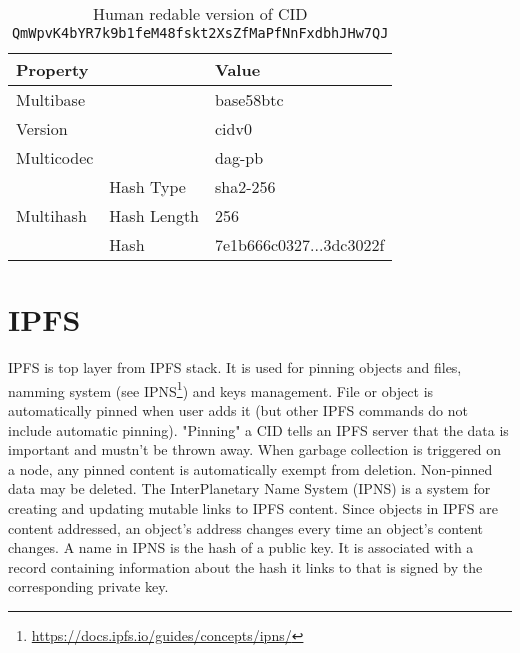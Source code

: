 \begin{table}[]
    \centering
    \begin{tabular}{|ll|l|}
    \hline
    \textbf{Property}                  &             & \textbf{Value}                                                            \\ \hline
    Multibase                                        &             & base58btc                                                        \\ \hline
    Version                                          &             & cidv0                                                            \\ \hline
    Multicodec                                       &             & dag-pb                                                           \\ \hline
    \multicolumn{1}{|l|}{\multirow{3}{*}{Multihash}} & Hash Type   & sha2-256                                                         \\ \cline{2-3} 
    \multicolumn{1}{|l|}{}                           & Hash Length & 256                                                              \\ \cline{2-3} 
    \multicolumn{1}{|l|}{}                           & Hash        & 7e1b666c0327...3dc3022f \\ \hline
    \end{tabular}
    \caption{Human redable version of CID \texttt{QmWpvK4bYR7k9b1feM48fskt2XsZfMaPfNnF\-xdbhJHw7QJ}}
    \label{tab:CIDexample}
\end{table}

\section{IPFS}
IPFS is top layer from IPFS stack. It is used for pinning objects and files, namming system (see IPNS\footnote{\url{https://docs.ipfs.io/guides/concepts/ipns/}}) and keys management. File or object is automatically pinned when user adds it (but other IPFS commands do not include automatic pinning). "Pinning" a CID tells an IPFS server that the data is important and mustn't be thrown away. When garbage collection is triggered on a node, any pinned content is automatically exempt from deletion. Non-pinned data may be deleted. The InterPlanetary Name System (IPNS) is a system for creating and updating mutable links to IPFS content. Since objects in IPFS are content addressed, an object's address changes every time an object's content changes. A name in IPNS is the hash of a public key. It is associated with a record containing information about the hash it links to that is signed by the corresponding private key.

